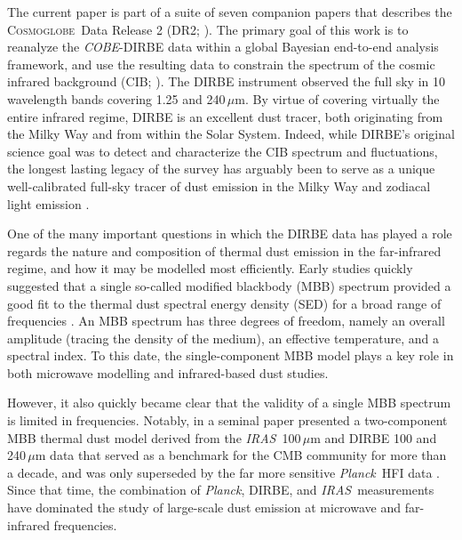 \documentclass{aa}
\def\Cosmoglobe{\textsc{Cosmoglobe}}
\def\Planck{\textit{Planck}}
\def\COBE{\textit{COBE}}
\def\IRAS{\textit{{IRAS}}}
\begin{document}
The current paper is part of a suite of seven companion papers that
describes the \Cosmoglobe\ Data Release 2 (DR2; \citealp{CG02_01}). The
primary goal of this work is to reanalyze the \COBE-DIRBE data
\citep{hauser1998} within a global Bayesian end-to-end analysis
framework, and use the resulting data to constrain the spectrum of the
cosmic infrared background (CIB; \citealp{CG02_03}). The DIRBE
instrument observed the full sky in 10 wavelength bands covering 1.25
and 240\,$\mu$m. By virtue of covering virtually the entire infrared
regime, DIRBE is an excellent dust tracer, both originating from the
Milky Way and from within the Solar System. Indeed, while DIRBE's
original science goal was to detect and characterize the CIB spectrum
and fluctuations, the longest lasting legacy of the survey has
arguably been to serve as a unique well-calibrated full-sky tracer of
dust emission in the Milky Way 
\citep{schlegel1998,IRIS,planck2014-a12,sano2016,pysm_methods}
and zodiacal
light emission \citep[e.g.,][]{K98,planck2013-pip88,2016AJ....151...71K,CG02_02,obrien2025}.%

One of the many important questions in which the DIRBE data has played a role
regards the nature and composition of thermal dust emission in the
far-infrared regime, and how it may be modelled most
efficiently. Early studies quickly suggested that a single so-called
modified blackbody (MBB) spectrum provided a good fit to the thermal
dust spectral energy density (SED) for a broad range of frequencies
\citep{reach1995b}. An MBB spectrum has three degrees of freedom, namely
an overall amplitude (tracing the density of the medium), an effective
temperature, and a spectral index. To this date, the
single-component MBB model plays a key role in both microwave
modelling and infrared-based dust studies.

However, it also quickly became clear that the validity of a single
MBB spectrum is limited in frequencies. Notably, in a seminal paper \citet{finkbeiner:1999} presented a two-component
MBB thermal dust model derived from the \IRAS\ 100\,$\mu$m and DIRBE 100
and 240\,$\mu$m data that served as a benchmark for the CMB community for more than a decade, and was
only superseded by the far more sensitive \Planck\ HFI data
\citep{planck2013-p06b}. Since that time, the combination of
\Planck, DIRBE, and \IRAS\ measurements have dominated the study of
large-scale dust emission at microwave and far-infrared frequencies.
\end{document}
